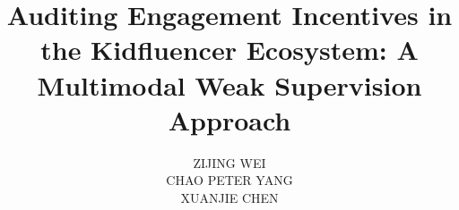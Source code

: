 \documentclass[]{ieeeaccess}
\begin{document}
\newlength{\xfigwd}
\setlength{\xfigwd}{\columnwidth}
\def\thevol{XX}
\def\theyear{2026}


\title{Auditing Engagement Incentives in the Kidfluencer Ecosystem: A Multimodal Weak Supervision Approach}

\setcounter{counter1}{1}
\author{
\begin{itemize*}[label={}, afterlabel={}, itemjoin={,~}, itemjoin*={, AND~}]
\item{\uppercase{Zijing Wei}}
\item{\uppercase{Chao Peter Yang}}
\item{\uppercase{Xuanjie Chen}}
\end{itemize*}
}

\address[1]{College of Liberal Arts \& Sciences, University of Illinois at Urbana-Champaign, Urbana, IL, USA (e-mail: zijingw4@illinois.edu; ORCID: 0009-0002-4081-4511)}
\address[2]{Duke University, Durham, NC, USA (e-mail: peter.yang@duke.edu; ORCID: 0009-0006-7341-8979)}
\address[3]{Department of Applied Mathematics, University of Washington, Seattle, WA, USA (e-mail: xjay0202@gmail.com)}
\end{document}

